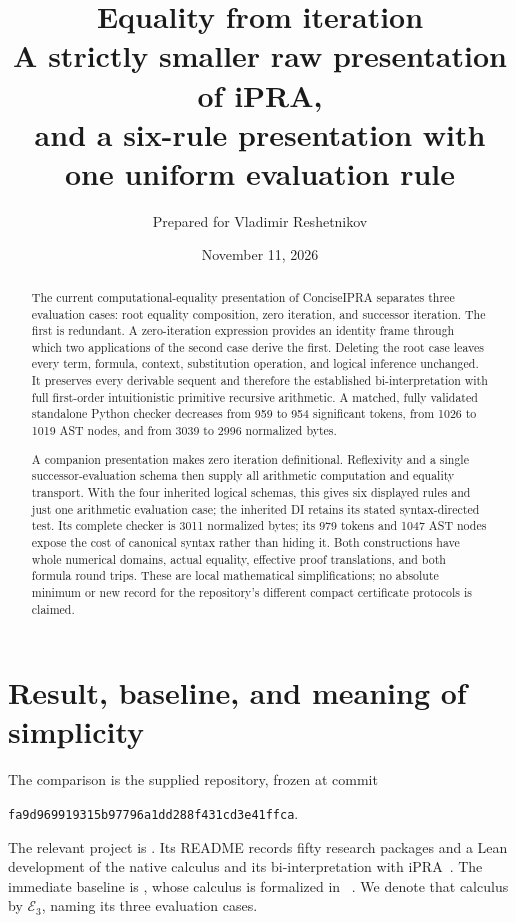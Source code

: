 \documentclass[11pt]{article}
\title{\textbf{Equality from iteration}\\[4pt]
\large A strictly smaller raw presentation of iPRA,\\
and a six-rule presentation with one uniform evaluation rule}
\author{Prepared for Vladimir Reshetnikov}
\date{November 11, 2026}
\theoremstyle{definition}\newtheorem{definition}[theorem]{Definition}
\newcommand{\Ethree}{\mathcal E_3}
\begin{document}
\maketitle
\begin{abstract}
The current computational-equality presentation of ConciseIPRA separates
three evaluation cases: root equality composition, zero iteration, and
successor iteration. The first is redundant. A zero-iteration expression
provides an identity frame through which two applications of the second
case derive the first. Deleting the root case leaves every term, formula,
context, substitution operation, and logical inference unchanged. It
preserves every derivable sequent and therefore the established
bi-interpretation with full first-order intuitionistic primitive recursive
arithmetic. A matched, fully validated standalone Python checker decreases
from 959 to 954 significant tokens, from 1026 to 1019 AST nodes, and from
3039 to 2996 normalized bytes.

A companion presentation makes zero iteration definitional. Reflexivity
and a single successor-evaluation schema then supply all arithmetic
computation and equality transport. With the four inherited logical
schemas, this gives six displayed rules and just one arithmetic evaluation
case; the inherited DI retains its stated syntax-directed test. Its complete checker
is 3011 normalized bytes; its 979 tokens and 1047 AST nodes expose the cost
of canonical syntax rather than hiding it. Both constructions have whole
numerical domains, actual equality, effective proof translations, and both
formula round trips. These are local mathematical simplifications; no
absolute minimum or new record for the repository's different compact
certificate protocols is claimed.
\end{abstract}

\section{Result, baseline, and meaning of simplicity}

The comparison is the supplied repository, frozen at commit
\begin{center}\small\texttt{fa9d969919315b97796a1dd288f431cd3e41ffca}.\end{center}
The relevant project is
.
Its README records fifty research packages and a Lean development of the
native calculus and its bi-interpretation with iPRA~\cite{repo}.
The immediate baseline is , whose
calculus is formalized in ~\cite{eval}.
We denote that calculus by $\Ethree$, naming its three evaluation cases.
\end{document}
